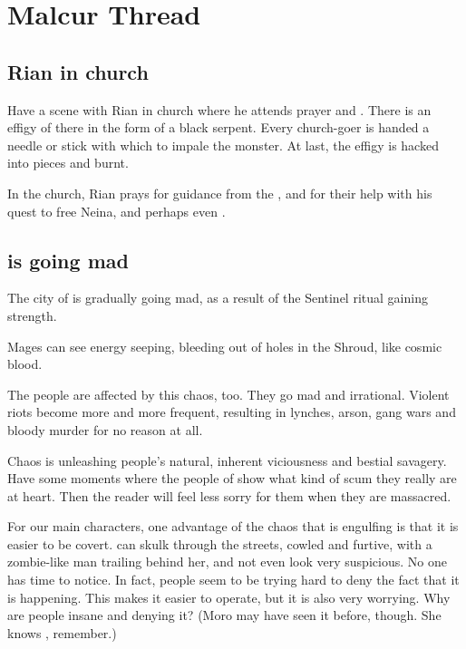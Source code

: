 \section{Malcur Thread}









\subsection{Rian in church}
Have a scene with Rian in church where he attends prayer and . 
There is an effigy of \Isphet there in the form of a black serpent. 
Every church-goer is handed a needle or stick with which to impale the monster. 
At last, the effigy is hacked into pieces and burnt. 

In the church, Rian prays for guidance from the \sephiroth, and for their help with his quest to free Neina, and perhaps even . 









\subsection[Malcur is going mad]{\Malcur is going mad}
The city of \Malcur is gradually going mad, as a result of the Sentinel ritual gaining strength. 

Mages can see energy seeping, bleeding out of holes in the Shroud, like cosmic blood. 

The people are affected by this chaos, too. They go mad and irrational. Violent riots become more and more frequent, resulting in lynches, arson, gang wars and bloody murder for no reason at all. 

Chaos is unleashing people's natural, inherent viciousness and bestial savagery. 
Have some  moments where the people of \Malcur show what kind of scum they really are at heart. 
Then the reader will feel less sorry for them when they are massacred. 

For our main characters, one advantage of the chaos that is engulfing \Malcur is that it is easier to be covert. 
\MoroCobrel can skulk through the streets, cowled and furtive, with a zombie-like man trailing behind her, and not even look very suspicious. 
No one has time to notice. 
In fact, people seem to be trying hard to deny the fact that it is happening. 
This makes it easier to operate, but it is also very worrying.
Why are people insane and denying it?
(Moro may have seen it before, though. She knows \Ubloth, remember.)

